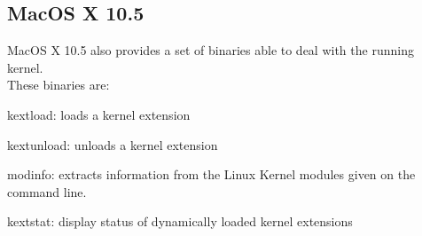 \documentclass[11pt]{report}
\begin{document}
  \subsection{MacOS X 10.5}
MacOS X 10.5 also provides a set of binaries able to deal with the running
kernel.\\
These binaries are:
    \begin{description}
      \item{kextload: loads a kernel extension}
      \item{kextunload: unloads a kernel extension}
      \item{modinfo: extracts information from the Linux Kernel modules
	given on the command line.}
      \item{kextstat: display status of dynamically loaded kernel extensions}
    \end{description}
\end{document}
